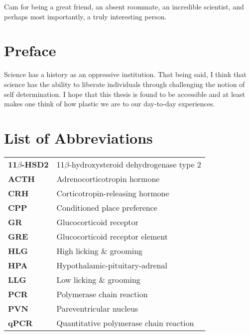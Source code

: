 \documentclass[12pt,twoside]{reedthesis}
\begin{document}
	Cam for being a great friend, an absent roommate, an incredible scientist, and perhaps most importantly, a truly interesting person.
	

    \chapter*{Preface}
	Science has a history as an oppressive institution. That being said, I think that science has the ability to liberate individuals through challenging the notion of self determination. I hope that this thesis is found to be accessible and at least makes one think of how plastic we are to our day-to-day experiences.

    \chapter*{List of Abbreviations}

	\begin{table}[h]
	\centering %
	\begin{tabular}{ll}
    \textbf{11$\beta$-HSD2} & 11$\beta$-hydroxysteroid dehydrogenase type 2\\
    \textbf{ACTH} & Adrenocorticotropin hormone\\
    \textbf{CRH} & Corticotropin-releasing hormone \\
    \textbf{CPP} & Conditioned place preference\\
    \textbf{GR} & Glucocorticoid receptor \\
    \textbf{GRE} & Glucocorticoid receptor element \\
    \textbf{HLG} & High licking \& grooming \\
    \textbf{HPA} & Hypothalamic-pituitary-adrenal \\
    \textbf{LLG}  	&  Low licking \& grooming \\
    \textbf{PCR} & Polymerase chain reaction\\
    \textbf{PVN} & Pareventricular nucleus \\
    \textbf{qPCR} & Quantitative polymerase chain reaction\\
	\end{tabular}
	\end{table}
	

    \tableofcontents
    \listoftables
    \listoffigures
\end{document}
